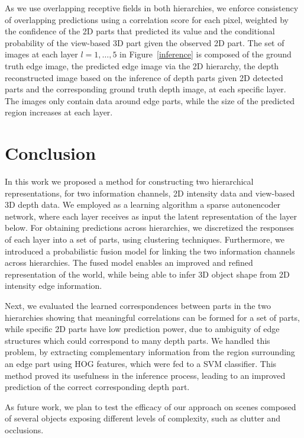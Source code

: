 \documentclass[runningheads]{llncs}
\begin{document}
As we use overlapping receptive fields in both hierarchies, we enforce consistency of overlapping predictions using a correlation score for each pixel, weighted by the confidence of the 2D parts that predicted its value and the conditional probability of the view-based 3D part given the observed 2D part. 
The set of images at each layer $l=1,\ldots,5$ in Figure~\ref{inference} is composed of the ground truth edge image, the predicted edge image via the 2D hierarchy, the depth reconstructed image based on the inference of depth parts given 2D detected parts and the corresponding ground truth depth image, at each specific layer. The images only contain data around edge parts, while the size of the predicted region increases at each layer.

\section{Conclusion}
\label{sec:conclusions}

In this work we proposed a method for constructing two hierarchical representations, for two information channels, 2D intensity data and view-based 3D depth data. We employed as a learning algorithm a sparse autonencoder network, where each layer receives as input the latent representation of the layer below. For obtaining predictions across hierarchies, we discretized the responses of each layer into a set of parts, using clustering techniques. Furthermore, we introduced a probabilistic fusion model for linking the two information channels across hierarchies. The fused model enables an improved and refined representation of the world, while being able to infer 3D object shape from 2D intensity edge information.

Next, we evaluated the learned correspondences between parts in the two hierarchies showing that meaningful correlations can be formed for a set of parts, while specific 2D parts have low prediction power, due to ambiguity of edge structures which could correspond to many depth parts. We handled this problem, by extracting complementary information from the region surrounding an edge part using HOG features, which were fed to a SVM classifier. This method proved its usefulness in the inference process, leading to an improved prediction of the correct corresponding depth part.

As future work, we plan to test the efficacy of our approach on scenes composed of several objects exposing different levels of complexity, such as clutter and occlusions.



\end{document}

